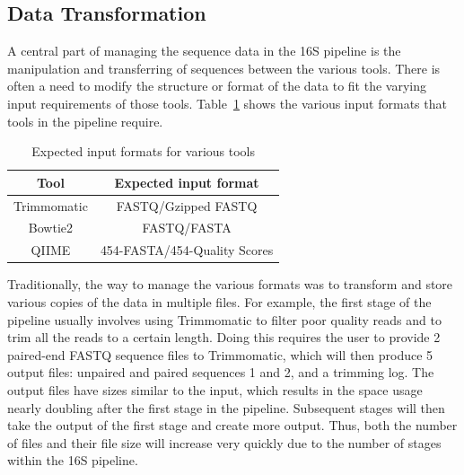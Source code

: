 \documentclass[12pt]{article}
\begin{document}
	
	\subsection{Data Transformation} %
	\label{sec:data_transformation}
	A central part of managing the sequence data in the 16S pipeline is the manipulation
	and transferring of sequences between the various tools. There is often a need
	to modify the structure or format of the data to fit the varying input requirements
	of those tools. Table~\ref{tab:expected_input} shows the various input formats that
	tools in the pipeline require.

	\begin{table}
		\centering
		\begin{tabular}{c|c}
		\hline
		Tool & Expected input format\\
		\hline
		Trimmomatic & FASTQ/Gzipped FASTQ\\
		\hline
		Bowtie2 & FASTQ/FASTA\\
		\hline
		QIIME & 454-FASTA/454-Quality Scores\\
		\hline
		\end{tabular}
		\caption{Expected input formats for various tools}
		\label{tab:expected_input}
	\end{table}

	Traditionally, the way to manage the various formats was to transform and store
	various copies of the data in multiple files. For example, the first stage of 
	the pipeline usually involves using Trimmomatic to filter poor quality reads 
	and to trim all the reads to a certain length. Doing this requires the user to
	provide 2 paired-end FASTQ sequence files to Trimmomatic, which will then produce
	5 output files: unpaired and paired sequences 1 and 2, and a trimming log. The 
	output files have sizes similar to the input, which results in the space usage
	nearly doubling after the first stage in the pipeline. Subsequent stages will
	then take the output of the first stage and create more output. Thus, both
	the number of files and their file size will increase very quickly due to the 
	number of stages within the 16S pipeline.
	
\end{document}
